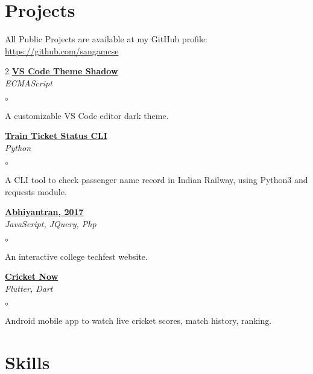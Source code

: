 \documentclass[margin,line]{resume}
\begin{document}
\begin{resume}
    \section{\mysidestyle Projects}
    All Public Projects are available at my GitHub profile: \url{https://github.com/sangamcse}                        %
    \vspace{-3mm}
    \begin{multicols}{2}
        \textbf{\href{https://github.com/sangamcse/theme-shadow-vscode}{VS Code Theme Shadow}}                      \\%
        \emph{ECMAScript}
        \begin{list}{$\circ$}{}
            \item A customizable VS Code editor dark theme.
        \end{list}

        \textbf{\href{https://github.com/sangamcse/myPNRStatus}{Train Ticket Status CLI}}                           \\%
        \emph{Python}
        \begin{list}{$\circ$}{}
            \item A CLI tool to check passenger name record in Indian Railway, using Python3 and requests module.     %
        \end{list}

        \textbf{\href{https://github.com/sangamcse/abhiyantran-2017}{Abhiyantran, 2017}}                            \\%
        \emph{JavaScript, JQuery, Php}
        \begin{list}{$\circ$}{}
            \item An interactive college techfest website.
        \end{list}

        \textbf{\href{https://play.google.com/store/apps/details?id=com.sports.cricket_now}{Cricket Now}}           \\%
        \emph{Flutter, Dart}
        \begin{list}{$\circ$}{}
            \item Android mobile app to watch live cricket scores, match history, ranking.
        \end{list}
    \end{multicols}

    \section{\mysidestyle Skills}


\end{resume}
\end{document}
